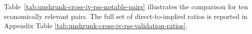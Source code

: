 \documentclass[a4paper, article, english, oneside, unknownkeysallowed, 12pt]{memoir}
\begin{document}
Table~\ref{tab:unshrunk-cross-iv-rss-notable-pairs} illustrates the comparison for ten economically relevant pairs. 
The full set of direct-to-implied ratios is reported in Appendix Table \ref{tab:unshrunk-cross-iv-rss-validation-ratios}.





\end{document}
